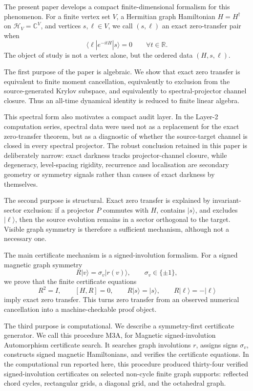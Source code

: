 \documentclass[11pt]{article}
\theoremstyle{definition}
\newcommand{\cH}{\mathcal H}
\newcommand{\R}{\mathbb R}
\begin{document}
The present paper develops a compact finite-dimensional formalism for this phenomenon. For a finite vertex set $V$, a Hermitian graph Hamiltonian $H=H^\dagger$ on $\cH_V=\mathbb C^V$, and vertices $s,\ell\in V$, we call $(s,\ell)$ an exact zero-transfer pair when
\[
\langle \ell|e^{-itH}|s\rangle=0\qquad \forall t\in\R .
\]
The object of study is not a vertex alone, but the ordered data $(H,s,\ell)$.

The first purpose of the paper is algebraic. We show that exact zero transfer is equivalent to finite moment cancellation, equivalently to exclusion from the source-generated Krylov subspace, and equivalently to spectral-projector channel closure. Thus an all-time dynamical identity is reduced to finite linear algebra.

This spectral form also motivates a compact audit layer. In the Layer-2 computation series, spectral data were used not as a replacement for the exact zero-transfer theorem, but as a diagnostic of whether the source-target channel is closed in every spectral projector. The robust conclusion retained in this paper is deliberately narrow: exact darkness tracks projector-channel closure, while degeneracy, level-spacing rigidity, recurrence and localisation are secondary geometry or symmetry signals rather than causes of exact darkness by themselves.

The second purpose is structural. Exact zero transfer is explained by invariant-sector exclusion: if a projector $P$ commutes with $H$, contains $|s\rangle$, and excludes $|\ell\rangle$, then the source evolution remains in a sector orthogonal to the target. Visible graph symmetry is therefore a sufficient mechanism, although not a necessary one.

The main certificate mechanism is a signed-involution formalism. For a signed magnetic graph symmetry
\[
R|v\rangle=\sigma_v|r(v)\rangle,\qquad \sigma_v\in\{\pm1\},
\]
we prove that the finite certificate equations
\[
R^2=I,\qquad [H,R]=0,\qquad R|s\rangle=|s\rangle,\qquad R|\ell\rangle=-|\ell\rangle
\]
imply exact zero transfer. This turns zero transfer from an observed numerical cancellation into a machine-checkable proof object.

The third purpose is computational. We describe a symmetry-first certificate generator. We call this procedure M3A, for Magnetic signed-involution Automorphism certificate search. It searches graph involutions $r$, assigns signs $\sigma_v$, constructs signed magnetic Hamiltonians, and verifies the certificate equations. In the computational run reported here, this procedure produced thirty-four verified signed-involution certificates on selected non-cycle finite graph supports: reflected chord cycles, rectangular grids, a diagonal grid, and the octahedral graph.
\end{document}
